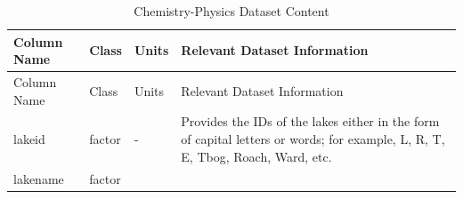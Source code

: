 \documentclass[12pt,]{article}
\begin{document}
\begin{longtable}[]{@{}llll@{}}
\caption{Chemistry-Physics Dataset Content}\tabularnewline
\toprule
\begin{minipage}[b]{0.24\columnwidth}\raggedright
Column Name\strut
\end{minipage} & \begin{minipage}[b]{0.15\columnwidth}\raggedright
Class\strut
\end{minipage} & \begin{minipage}[b]{0.12\columnwidth}\raggedright
Units\strut
\end{minipage} & \begin{minipage}[b]{0.38\columnwidth}\raggedright
Relevant Dataset Information\strut
\end{minipage}\tabularnewline
\midrule
\endfirsthead
\toprule
\begin{minipage}[b]{0.24\columnwidth}\raggedright
Column Name\strut
\end{minipage} & \begin{minipage}[b]{0.15\columnwidth}\raggedright
Class\strut
\end{minipage} & \begin{minipage}[b]{0.12\columnwidth}\raggedright
Units\strut
\end{minipage} & \begin{minipage}[b]{0.38\columnwidth}\raggedright
Relevant Dataset Information\strut
\end{minipage}\tabularnewline
\midrule
\endhead
\begin{minipage}[t]{0.24\columnwidth}\raggedright
lakeid\strut
\end{minipage} & \begin{minipage}[t]{0.15\columnwidth}\raggedright
factor\strut
\end{minipage} & \begin{minipage}[t]{0.12\columnwidth}\raggedright
-\strut
\end{minipage} & \begin{minipage}[t]{0.38\columnwidth}\raggedright
Provides the IDs of the lakes either in the form of capital letters or
words; for example, L, R, T, E, Tbog, Roach, Ward, etc.\strut
\end{minipage}\tabularnewline
\begin{minipage}[t]{0.24\columnwidth}\raggedright
lakename\strut
\end{minipage} & \begin{minipage}[t]{0.15\columnwidth}\raggedright
factor\strut
\end{minipage} & \begin{minipage}[t]{0.12\columnwidth}\raggedright

\end{minipage}
\end{longtable}
\end{document}
